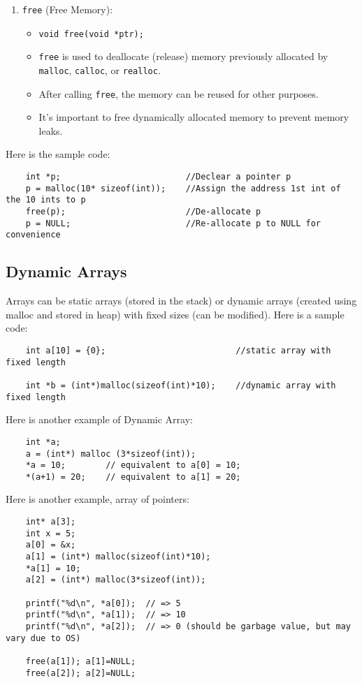 \documentclass{article}
\begin{document}
\begin{enumerate}
  \item \texttt{free} (Free Memory):
    \begin{itemize}
      \item \texttt{void free(void *ptr);}
      \item \texttt{free} is used to deallocate (release) memory previously allocated by \texttt{malloc}, \texttt{calloc}, or \texttt{realloc}.
      \item After calling \texttt{free}, the memory can be reused for other purposes.
      \item It's important to free dynamically allocated memory to prevent memory leaks.
    \end{itemize}
\end{enumerate}
Here is the sample code:
\begin{verbatim}
    int *p;                         //Declear a pointer p
    p = malloc(10* sizeof(int));    //Assign the address 1st int of the 10 ints to p
    free(p);                        //De-allocate p
    p = NULL;                       //Re-allocate p to NULL for convenience
\end{verbatim}

\subsection{Dynamic Arrays}

Arrays can be static arrays (stored in the stack) or dynamic arrays (created using malloc and stored in heap) with fixed sizes (can be modified). Here is a sample code:
\begin{verbatim}
    int a[10] = {0};                          //static array with fixed length

    int *b = (int*)malloc(sizeof(int)*10);    //dynamic array with fixed length
\end{verbatim}
Here is another example of Dynamic Array:
\begin{verbatim}
    int *a;
    a = (int*) malloc (3*sizeof(int));
    *a = 10;        // equivalent to a[0] = 10;
    *(a+1) = 20;    // equivalent to a[1] = 20;
\end{verbatim}
Here is another example, array of pointers:
\begin{verbatim}
    int* a[3];
    int x = 5;
    a[0] = &x;
    a[1] = (int*) malloc(sizeof(int)*10);
    *a[1] = 10;
    a[2] = (int*) malloc(3*sizeof(int));

    printf("%d\n", *a[0]);  // => 5
    printf("%d\n", *a[1]);  // => 10
    printf("%d\n", *a[2]);  // => 0 (should be garbage value, but may vary due to OS)

    free(a[1]); a[1]=NULL;
    free(a[2]); a[2]=NULL;
    
\end{verbatim}
\end{document}

